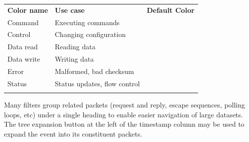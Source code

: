 \begin{tabularx}{16cm}{llX}
\thickhline
\textbf{Color name} & \textbf{Use case} & \textbf{Default Color} \\
\thickhline
Command & Executing commands & \cellcolor{protocmd}\textcolor{white}{\#600050} \\
\thickhline
Control & Changing configuration & \cellcolor{protoctl}\textcolor{white}{\#808000} \\
\thickhline
Data read & Reading data & \cellcolor{protoread}\textcolor{white}{\#336699} \\
\thickhline
Data write & Writing data & \cellcolor{protowrite}\textcolor{white}{\#339966} \\
\thickhline
Error & Malformed, bad checksum & \cellcolor{protoerror}\textcolor{white}{\#ff0000} \\
\thickhline
Status & Status updates, flow control & \cellcolor{protostatus}\textcolor{white}{\#000080} \\
\thickhline
\end{tabularx}

Many filters group related packets (request and reply, escape sequences, polling loops, etc) under a single heading to
enable easier navigation of large datasets. The tree expansion button at the left of the timestamp column may be used to expand
the event into its constituent packets.

